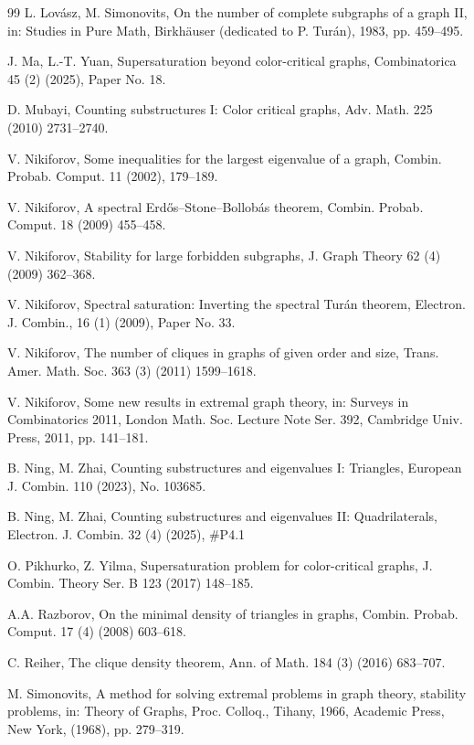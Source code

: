 \documentclass[11pt,a4paper]{article}
\theoremstyle{definition}
\theoremstyle{plain}
\begin{document}
\begin{thebibliography}{99}
L. Lov\'{a}sz, M. Simonovits,
On the number of complete subgraphs of a graph II,
in: Studies in Pure Math, Birkh\"{a}user (dedicated to P. Tur\'{a}n), 1983,
pp. 459--495. 

J. Ma, L.-T. Yuan, 
Supersaturation beyond color-critical graphs, 
Combinatorica 45 (2) (2025), Paper No. 18. 

D. Mubayi,
Counting substructures I: Color critical graphs,
Adv. Math. 225 (2010) 2731--2740. 

V. Nikiforov,
{Some inequalities for the largest eigenvalue of a graph},
Combin. Probab. Comput. 11 (2002), 179--189.

V. Nikiforov, 
A spectral Erd\H{o}s--Stone--Bollob\'{a}s theorem, 
Combin. Probab.  Comput. 18 (2009) 455--458.  

V. Nikiforov, 
Stability for large forbidden subgraphs,  
J. Graph Theory 62  (4) (2009)  362--368.  

V. Nikiforov, Spectral saturation: Inverting the spectral Tur\'an theorem,  Electron. J. Combin., 16 (1) (2009), Paper No. 33.

V. Nikiforov, The number of cliques in graphs of given order and size,
Trans. Amer. Math. Soc. 363 (3) (2011) 1599--1618. 

V. Nikiforov,
Some new results in extremal graph theory,
in: Surveys in Combinatorics 2011, London Math. Soc. Lecture Note Ser. 392,
Cambridge Univ. Press, 2011, pp. 141--181.
 
B. Ning, M. Zhai, 
{Counting substructures and eigenvalues I: Triangles}, 
European J. Combin.  110 (2023), No. 103685. 

B. Ning, M. Zhai, 
{Counting substructures and eigenvalues II: Quadrilaterals}, 
Electron. J. Combin. 32 (4) (2025), \#P4.1 


O. Pikhurko, Z. Yilma, 
Supersaturation problem for color-critical graphs, 
J. Combin. Theory Ser. B 123 (2017) 148--185.

A.A. Razborov,
On the minimal density of triangles in graphs,
Combin. Probab. Comput. 17 (4) (2008) 603--618. 

 C. Reiher, The clique density theorem, 
 Ann. of Math. 184 (3) (2016) 683--707.
 
M. Simonovits, A method for solving extremal problems in graph theory, stability problems, in: Theory of Graphs, Proc. Colloq., Tihany, 1966, Academic Press, New York, (1968), pp. 279--319.



\end{thebibliography}
\end{document}

